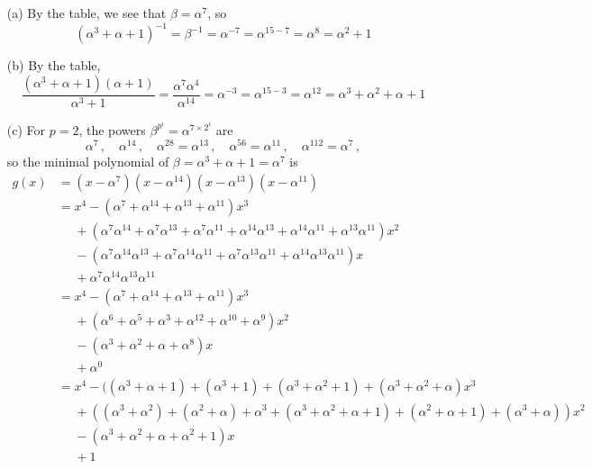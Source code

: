 \documentclass[11pt]{article}
\newcommand{\ph}{\phantom}
\begin{document}
\begin{itemize}
  \item[{(a)}] By the table, we see that $\beta = \alpha^7$, so 
    \[
      (\alpha^3+\alpha+1)^{-1} = \beta^{-1} = \alpha^{-7} = \alpha^{15-7} = \alpha^8 = \alpha^2 + 1
    \]
  \item[{(b)}] By the table, 
    \[
        \frac{(\alpha^3+\alpha+1)(\alpha+1)}{\alpha^3+1} 
      = \frac{\alpha^7\alpha^4}{\alpha^{14}} 
      = \alpha^{-3}
      = \alpha^{15-3}
      = \alpha^{12}
      = \alpha^3 + \alpha^2 + \alpha + 1 
    \]
  \item[{(c)}] For $p = 2$, the powers $\beta^{p^i} = \alpha^{7\times 2^i}$ are
  \[
    \alpha^7\,,\quad
    \alpha^{14}\,,\quad
    \alpha^{28} = \alpha^{13}\,,\quad
    \alpha^{56} = \alpha^{11}\,,\quad
    \alpha^{112} = \alpha^{7}\,,
  \]
  so the minimal polynomial of $\beta = \alpha^3+\alpha+1 = \alpha^7$ is
    \begin{align*}
      g(x) &= (x-\alpha^7)(x-\alpha^{14})(x-\alpha^{13})(x-\alpha^{11})\\
           &= x^4 - (\alpha^7+\alpha^{14}+\alpha^{13}+\alpha^{11})x^3\\
           &\ph{=} + (\alpha^7\alpha^{14}+\alpha^7\alpha^{13}+\alpha^7\alpha^{11}+\alpha^{14}\alpha^{13}+\alpha^{14}\alpha^{11}+\alpha^{13}\alpha^{11})x^2\\
           &\ph{=} - (\alpha^7\alpha^{14}\alpha^{13}+\alpha^7\alpha^{14}\alpha^{11}+\alpha^7\alpha^{13}\alpha^{11}+\alpha^{14}\alpha^{13}\alpha^{11})x\\
           &\ph{=} +  \alpha^7\alpha^{14}\alpha^{13}\alpha^{11}\\
           &= x^4 - (\alpha^7+\alpha^{14}+\alpha^{13}+\alpha^{11})x^3\\
           &\ph{=} + (\alpha^6+\alpha^5+\alpha^3+\alpha^{12}+\alpha^{10}+\alpha^9)x^2\\
           &\ph{=} - (\alpha^3+\alpha^2+\alpha+\alpha^8)x\\
           &\ph{=} +  \alpha^0\\
           &= x^4 - ((\alpha^3 + \alpha + 1) +(\alpha^3 + 1) + (\alpha^3 + \alpha^2 + 1) + (\alpha^3 + \alpha^2 + \alpha)x^3\\
           &\ph{=} + ((\alpha^3 + \alpha^2) + (\alpha^2 + \alpha) + \alpha^3 + (\alpha^3 + \alpha^2 + \alpha + 1) + (\alpha^2 + \alpha + 1) + (\alpha^3 + \alpha))x^2\\
           &\ph{=} - (\alpha^3+\alpha^2+\alpha+\alpha^2 + 1)x\\
           &\ph{=} + 1\\

\end{align*}
\end{itemize}
\end{document}

